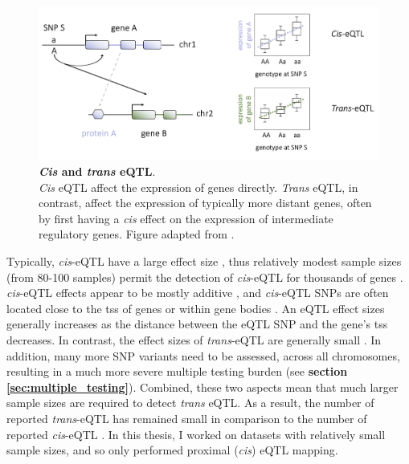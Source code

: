 \begin{figure}[h]
\centering
\includegraphics[width=15cm]{Chapter1/Fig/eqtl.png}
\caption[\textit{Cis} and \textit{trans} eQTL]{\textbf{\textit{Cis} and \textit{trans} eQTL}.\\
\textit{Cis} eQTL affect the expression of genes directly. 
\textit{Trans} eQTL, in contrast, affect the expression of typically more distant genes, often by first having a \textit{cis} effect on the expression of intermediate regulatory genes.
Figure adapted from \cite{westra2014genome}.
}
\label{fig:eqtl}
\end{figure}


Typically, \textit{cis}-eQTL have a large effect size \cite{sherman2009systematic}, thus relatively modest sample sizes (from 80-100 samples) permit the detection of \textit{cis}-eQTL for thousands of genes \cite{stranger2007population, myers2007survey}.
\textit{cis}-eQTL effects appear to be mostly additive \cite{powell2013congruence}, and \textit{cis}-eQTL SNPs are often located close to the \gls{tss} of genes or within gene bodies \cite{vosa2018unraveling}. 
An eQTL effect sizes generally increases as the distance between the eQTL SNP and the gene's \gls{tss} decreases.
In contrast, the effect sizes of \textit{trans}-eQTL are generally small \cite{cookson2009mapping, grundberg2012mapping}. 
In addition, many more SNP variants need to be assessed, across all chromosomes, resulting in a much more severe multiple testing burden (see \textbf{section \ref{sec:multiple_testing}}).
Combined, these two aspects mean that much larger sample sizes are required to detect \textit{trans} eQTL.
As a result, the number of reported \textit{trans}-eQTL has remained small \cite{grundberg2012mapping} in comparison to the number of reported \textit{cis}-eQTL \cite{westra2014genome}.
In this thesis, I worked on datasets with relatively small sample sizes, and so only performed proximal (\textit{cis}) eQTL mapping.

